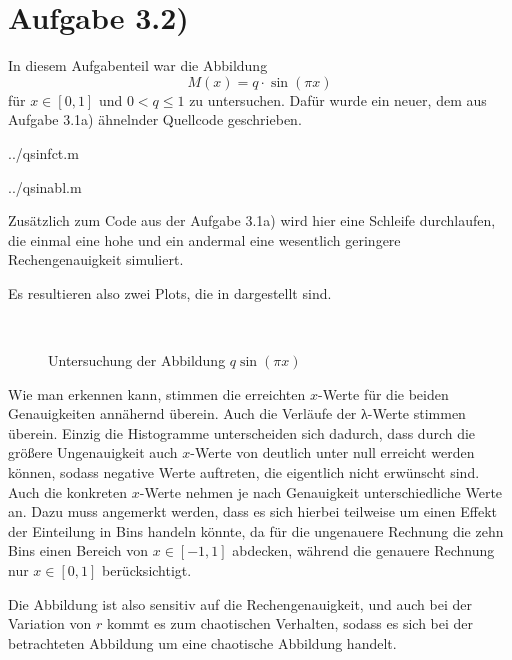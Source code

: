 \section*{Aufgabe 3.2)}
In diesem Aufgabenteil war die Abbildung $$M(x) = q\cdot \sin(πx)$$ für $x\in
[0,1]$ und $0< q \le 1$ zu untersuchen. Dafür wurde ein neuer, dem aus
Aufgabe 3.1a) ähnelnder Quellcode geschrieben.



 {../qsinfct.m}

 {../qsinabl.m}

Zusätzlich zum Code aus der Aufgabe 3.1a) wird hier eine Schleife durchlaufen,
die einmal eine hohe und ein andermal eine wesentlich geringere
Rechengenauigkeit simuliert. 

Es resultieren also zwei Plots, die in  dargestellt sind.

\begin{figure}[htb]%
\begin{center}%
  \\
\caption{Untersuchung der Abbildung $q\sin(πx)$}
\label{fig:qsin}
\end{center}
\end{figure}

Wie man erkennen kann, stimmen die erreichten $x$-Werte für die beiden
Genauigkeiten annähernd überein. Auch die Verläufe der λ-Werte stimmen überein.
Einzig die Histogramme unterscheiden sich dadurch, dass durch die größere
Ungenauigkeit auch $x$-Werte von deutlich unter null erreicht werden können,
sodass negative Werte auftreten, die eigentlich nicht erwünscht sind. Auch
die konkreten $x$-Werte nehmen je nach Genauigkeit unterschiedliche Werte an.
Dazu muss angemerkt werden, dass es sich hierbei teilweise um einen Effekt der
Einteilung in Bins handeln könnte, da für die ungenauere Rechnung die zehn Bins
einen Bereich von $x \in [-1,1]$ abdecken, während die genauere Rechnung nur $x
\in [0,1]$ berücksichtigt.

Die Abbildung ist also sensitiv auf die Rechengenauigkeit, und auch bei der
Variation von $r$ kommt es zum chaotischen Verhalten, sodass es sich bei der
betrachteten Abbildung um eine chaotische Abbildung handelt.
